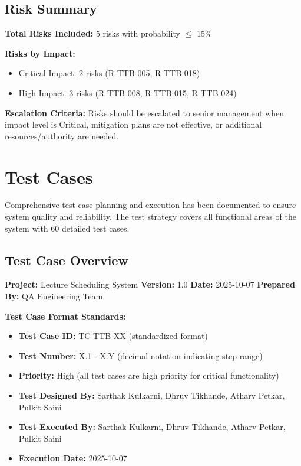 \subsection{Risk Summary}

\textbf{Total Risks Included:} 5 risks with probability $\leq$ 15\%

\textbf{Risks by Impact:}
\begin{itemize}[leftmargin=*]
    \item Critical Impact: 2 risks (R-TTB-005, R-TTB-018)
    \item High Impact: 3 risks (R-TTB-008, R-TTB-015, R-TTB-024)
\end{itemize}

\textbf{Escalation Criteria:} Risks should be escalated to senior management when impact level is Critical, mitigation plans are not effective, or additional resources/authority are needed.

\section{Test Cases}

Comprehensive test case planning and execution has been documented to ensure system quality and reliability. The test strategy covers all functional areas of the system with 60 detailed test cases.

\subsection{Test Case Overview}

\textbf{Project:} Lecture Scheduling System  
\textbf{Version:} 1.0  
\textbf{Date:} 2025-10-07  
\textbf{Prepared By:} QA Engineering Team

\textbf{Test Case Format Standards:}
\begin{itemize}[leftmargin=*]
    \item \textbf{Test Case ID:} TC-TTB-XX (standardized format)
    \item \textbf{Test Number:} X.1 - X.Y (decimal notation indicating step range)
    \item \textbf{Priority:} High (all test cases are high priority for critical functionality)
    \item \textbf{Test Designed By:} Sarthak Kulkarni, Dhruv Tikhande, Atharv Petkar, Pulkit Saini
    \item \textbf{Test Executed By:} Sarthak Kulkarni, Dhruv Tikhande, Atharv Petkar, Pulkit Saini
    \item \textbf{Execution Date:} 2025-10-07
\end{itemize}

